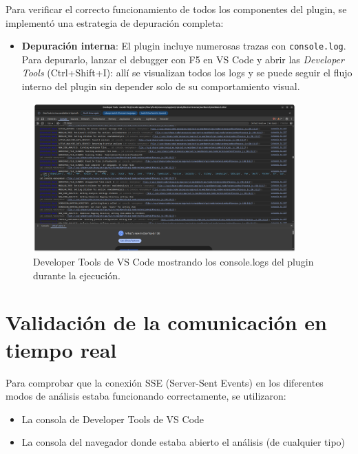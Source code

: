\documentclass[a4paper, 12pt]{book}
\begin{document}
Para verificar el correcto funcionamiento de todos los componentes del plugin, se implementó una estrategia de depuración completa:

\begin{itemize}
  \item \textbf{Depuración interna}: El plugin incluye numerosas trazas con \texttt{console.log}. Para depurarlo, lanzar el debugger con F5 en VS Code y abrir las \emph{Developer Tools} (Ctrl+Shift+I): allí se visualizan todos los logs y se puede seguir el flujo interno del plugin sin depender solo de su comportamiento visual.
\end{itemize}

\begin{figure}[H]
\centering
\includegraphics[width=0.9\textwidth]{img/developer-tools-logs.png}
\caption{Developer Tools de VS Code mostrando los console.logs del plugin durante la ejecución.}
\label{fig:developer-tools-logs}
\end{figure}

\section{Validación de la comunicación en tiempo real}
\label{sec:validacion-tiempo-real}

Para comprobar que la conexión SSE (Server-Sent Events) en los diferentes modos de análisis estaba funcionando correctamente, se utilizaron:

\begin{itemize}
  \item La consola de Developer Tools de VS Code
  \item La consola del navegador donde estaba abierto el análisis (de cualquier tipo)
\end{itemize}
\end{document}
